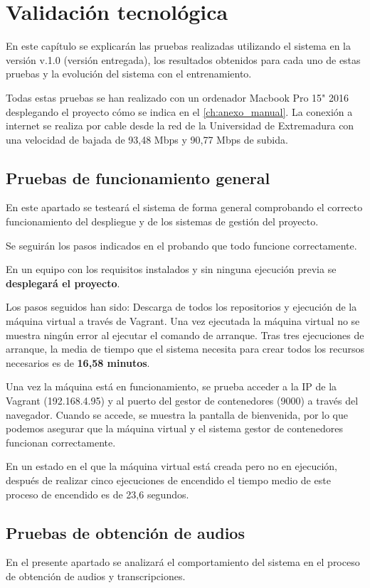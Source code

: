 \documentclass[../main.tex]{subfiles}
\begin{document}
 
\chapter{Validación tecnológica}\label{ch:validacion}
En este capítulo se explicarán las pruebas realizadas utilizando el sistema en la versión v.1.0 (versión entregada), los resultados obtenidos para cada uno de estas pruebas y la evolución del sistema con el entrenamiento.

Todas estas pruebas se han realizado con un ordenador Macbook Pro 15" 2016 desplegando el proyecto cómo se indica en el \autoref{ch:anexo_manual}. La conexión a internet se realiza por cable desde la red de la Universidad de Extremadura con una velocidad de bajada de 93,48 Mbps y 90,77 Mbps de subida.

\section{Pruebas de funcionamiento general}\label{sec:val-general}
En este apartado se testeará el sistema de forma general comprobando el correcto funcionamiento del despliegue y de los sistemas de gestión del proyecto.

Se seguirán los pasos indicados en el  probando que todo funcione correctamente.

En un equipo con los requisitos instalados y sin ninguna ejecución previa se \textbf{desplegará el proyecto}.

Los pasos seguidos han sido: Descarga de todos los repositorios y ejecución de la máquina virtual a través de Vagrant. Una vez ejecutada la máquina virtual no se muestra ningún error al ejecutar el comando de arranque. Tras tres ejecuciones de arranque, la media de tiempo que el sistema necesita para crear todos los recursos necesarios es de \textbf{16,58 minutos}.

Una vez la máquina está en funcionamiento, se prueba acceder a la IP de la Vagrant (192.168.4.95) y al puerto del gestor de contenedores (9000) a través del navegador. Cuando se accede, se muestra la pantalla de bienvenida, por lo que podemos asegurar que la máquina virtual y el sistema gestor de contenedores funcionan correctamente.

En un estado en el que la máquina virtual está creada pero no en ejecución, después de realizar cinco ejecuciones de encendido el tiempo medio de este proceso de encendido es de 23,6 segundos.

\section{Pruebas de obtención de audios}\label{sec:val-get}
En el presente apartado se analizará el comportamiento del sistema en el proceso de obtención de audios y transcripciones.
\end{document}
